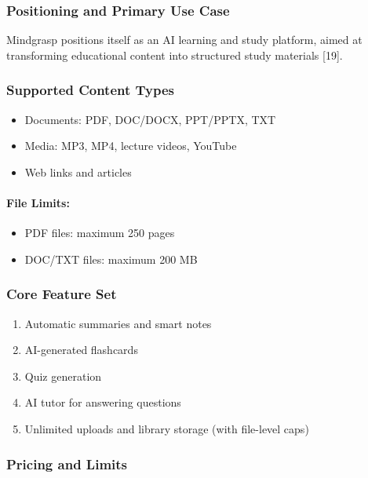 \documentclass[12pt, a4paper, oneside]{report}
\begin{document}
\subsubsection{Positioning and Primary Use Case}

Mindgrasp positions itself as an AI learning and study platform, aimed at transforming educational content into structured study materials [19].

\subsubsection{Supported Content Types}

\begin{itemize}[noitemsep]
  \item Documents: PDF, DOC/DOCX, PPT/PPTX, TXT
  \item Media: MP3, MP4, lecture videos, YouTube
  \item Web links and articles
\end{itemize}

\paragraph{File Limits:}
\begin{itemize}[noitemsep]
  \item PDF files: maximum 250 pages
  \item DOC/TXT files: maximum 200 MB
\end{itemize}


\subsubsection{Core Feature Set}

\begin{enumerate}[noitemsep]
  \item Automatic summaries and smart notes
  \item AI-generated flashcards
  \item Quiz generation
  \item AI tutor for answering questions
  \item Unlimited uploads and library storage (with file-level caps)
\end{enumerate}

\subsubsection{Pricing and Limits}
\end{document}
